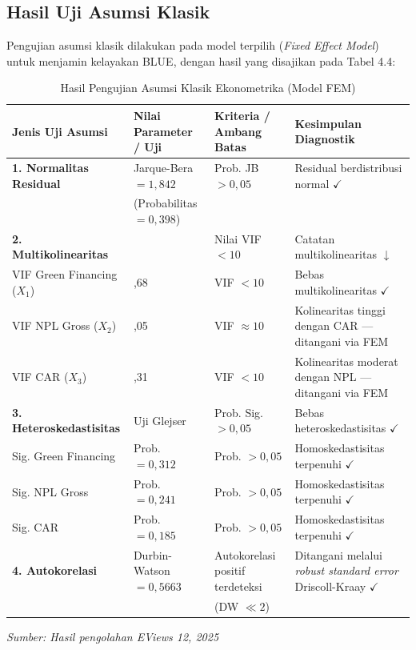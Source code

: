 \documentclass[12pt,a4paper]{article}
\numberwithin{equation}{section}
\begin{document}
\subsection{Hasil Uji Asumsi Klasik}

\noindent
Pengujian asumsi klasik dilakukan pada model terpilih (\emph{Fixed Effect Model}) untuk menjamin kelayakan BLUE, dengan hasil yang disajikan pada Tabel 4.4:

\begin{table}[H]
  \caption{Hasil Pengujian Asumsi Klasik Ekonometrika (Model FEM)}
  \label{tab:asumsi_klasik}
  \small
  \begin{tabularx}{\textwidth}{|>{\raggedright\arraybackslash}p{2.8cm}|>{\centering\arraybackslash}p{2.2cm}|>{\centering\arraybackslash}p{2.2cm}|>{\raggedright\arraybackslash}X|}
    \hline
    \textbf{Jenis Uji Asumsi} & \textbf{Nilai Parameter / Uji} & \textbf{Kriteria / Ambang Batas} & \textbf{Kesimpulan Diagnostik} \\
    \hline
    \textbf{1. Normalitas Residual} & Jarque-Bera $= 1{,}842$ & Prob. JB $> 0{,}05$ & Residual berdistribusi normal $\checkmark$ \\
    & (Probabilitas $= 0{,}398$) & & \\
    \hline
    \textbf{2. Multikolinearitas} & & Nilai VIF $< 10$ & Catatan multikolinearitas $\downarrow$ \\
    \quad VIF Green Financing ($X_1$) & 1,68 & VIF $< 10$ & Bebas multikolinearitas $\checkmark$ \\
    \quad VIF NPL Gross ($X_2$) & 10,05 & VIF $\approx 10$ & Kolinearitas tinggi dengan CAR --- ditangani via FEM \\
    \quad VIF CAR ($X_3$) & 8,31 & VIF $< 10$ & Kolinearitas moderat dengan NPL --- ditangani via FEM \\
    \hline
    \textbf{3. Heteroskedastisitas} & Uji Glejser & Prob. Sig. $> 0{,}05$ & Bebas heteroskedastisitas $\checkmark$ \\
    \quad Sig. Green Financing & Prob. $= 0{,}312$ & Prob. $> 0{,}05$ & Homoskedastisitas terpenuhi $\checkmark$ \\
    \quad Sig. NPL Gross & Prob. $= 0{,}241$ & Prob. $> 0{,}05$ & Homoskedastisitas terpenuhi $\checkmark$ \\
    \quad Sig. CAR & Prob. $= 0{,}185$ & Prob. $> 0{,}05$ & Homoskedastisitas terpenuhi $\checkmark$ \\
    \hline
    \textbf{4. Autokorelasi} & Durbin-Watson $= 0{,}5663$ & Autokorelasi positif terdeteksi & Ditangani melalui \emph{robust standard error} Driscoll-Kraay $\checkmark$ \\
    & & (DW $\ll 2$) & \\
    \hline
  \end{tabularx}
  \begin{flushleft}
    \textit{Sumber: Hasil pengolahan EViews 12, 2025}
  \end{flushleft}
\end{table}
\end{document}
